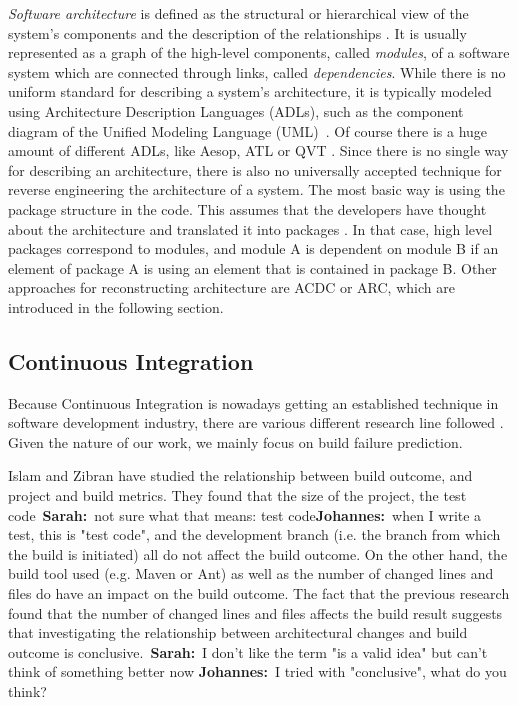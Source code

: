 \documentclass[sigplan, anonymous, review]{acmart}
\newcommand{\sn}[1]{{\color{blue}\textbf{Sarah:}~#1}}
\newcommand{\jk}[1]{{\color{violet}\textbf{Johannes:}~#1}}
\begin{document}
\textit{Software architecture} is defined as the structural or hierarchical view of the system's components and the description of the relationships \cite{arcDef}. It is usually represented as a graph of the high-level components, called \textit{modules}, of a software system which are connected through links, called \textit{dependencies}. While there is no uniform standard for describing a system's architecture, it is typically modeled using Architecture Description Languages (ADLs), such as the component diagram of the Unified Modeling Language (UML)~\cite{UML-Arch}. Of course there is a huge amount of different ADLs, like Aesop, ATL or QVT \cite{ADLs1, ADLs2}.
Since there is no single way for describing an architecture, there is also no universally accepted technique for reverse engineering the architecture of a system. The most basic way is using the package structure in the code. This assumes that the developers have thought about the architecture and translated it into packages \cite{arcPkg}. In that case, high level packages correspond to modules, and module A is dependent on module B if an element of package A is using an element that is contained in package B. 
Other approaches for reconstructing architecture are ACDC or ARC, which are introduced in the following section.

\subsection{Continuous Integration}

Because Continuous Integration is nowadays getting an established technique in software development industry, there are various different research line followed \cite{ci1, ci2, ci3, ci4}. Given the nature of our work, we mainly focus on build failure prediction.

Islam and Zibran \cite{FailsCorr} have studied the relationship between build outcome, and project and build metrics. 
They found that the size of the project, the test code~\sn{not sure what that means: test code}\jk{when I write a test, this is "test code"}, and the development branch (i.e. the branch from which the build is initiated) all do not affect the build outcome.
On the other hand, the build tool used (e.g. Maven or Ant) as well as the number of changed lines and files do have an impact on the build outcome.
The fact that the previous research found that the number of changed lines and files affects the build result suggests that investigating the relationship between architectural changes and build outcome is conclusive.~\sn{I don't like the term "is a valid idea" but can't think of something better now} \jk{I tried with "conclusive", what do you think?}
\end{document}
